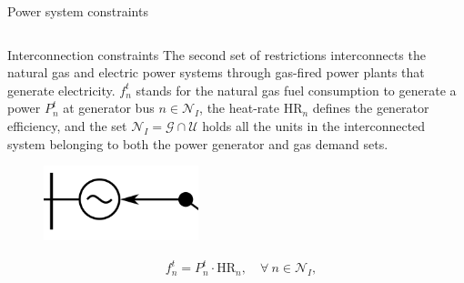 \documentclass[hyperref={colorlinks,citecolor=blue,linkcolor=blue,urlcolor=blue}]{beamer}
\begin{document}
\begin{frame}{Power system constraints}
\begin{columns}
\begin{column}{0.8\textwidth}
\end{column}
\end{columns}
\end{frame}

\begin{frame}{Interconnection constraints}
The second set of restrictions interconnects the natural gas and electric power systems through gas-fired power plants that generate electricity.  $f_{n}^t$ stands for the natural gas fuel consumption to generate a power $P_{n}^t$ at generator bus $n\in\mathcal{N}_I$, the heat-rate $\text{HR}_n$ defines the generator efficiency, and the set $\mathcal{N}_I=\mathcal{G}\cap\mathcal{U}$ holds all the units in the interconnected system belonging to both the power generator and gas demand sets.

\begin{figure}
    \centering
    \includegraphics[width=0.4\textwidth]{figures/Interconection.png}
    \label{fig:enter-label}
\end{figure}

\begin{align}
    &f_{n}^t = P_{n}^t \cdot \text{HR}_n, \quad \forall \ n \in \mathcal{N}_I, \label{eq:gas_power_relation} 
\end{align}
\end{frame}
\end{document}
